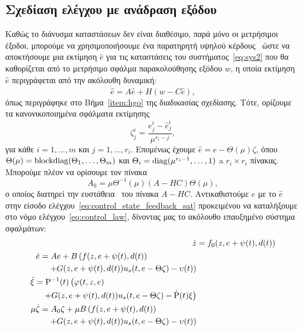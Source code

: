\subsection{Σχεδίαση ελέγχου με ανάδραση εξόδου}
\label{section:output_feedback}
Καθώς το διάνυσμα καταστάσεων δεν είναι διαθέσιμο, παρά μόνο οι μετρήσιμοι έξοδοι, μπορούμε να χρησιμοποιήσουμε ένα παρατηρητή υψηλού κέρδους~\cite{khalil1996noninear, atassi1999separation, khalil2008high} ώστε να αποκτήσουμε μια εκτίμηση $\hat e$ για τις καταστάσεις του συστήματος~\eqref{eq:sys2} που θα καθορίζεται από το μετρήσιμο σφάλμα παρακολούθησης εξόδου $w$, η οποία εκτίμηση $\hat e$ περιγράφεται από την ακόλουθη δυναμική:
\[
    \dot{\hat e} = A \hat e + H (w - C \hat e),
\]
όπως περιγράφηκε στο Βήμα~\ref{item:hgo} της διαδικασίας σχεδίασης. Τότε, ορίζουμε τα κανονικοποιημένα σφάλματα εκτίμησης
\[
    \zeta_j^i = \frac{e_j^i - \hat e_j^i}{\mu^{r_i-j}},
\]
για κάθε $i=1,\ldots,m$ και $j = 1,\ldots, r_i$. Επομένως έχουμε $\hat e = e - \Theta(\mu) \zeta$, όπου $\Theta(\mu) = \operatorname{blockdiag}(\Theta_1, \ldots, \Theta_m)$ και $\Theta_i = \operatorname{diag}(\mu^{r_i-1}, \ldots, 1)$ a $r_i \times r_i$ πίνακας. Μπορούμε πλέον να ορίσουμε τον πίνακα
\[
    A_0 = \mu \Theta^{-1}(\mu)(A - HC) \Theta(\mu),
\]
ο οποίος διατηρεί την ευστάθεια \hur\ του πίνακα $A-HC$. Αντικαθιστούμε $e$ με το $\hat e$ στην είσοδο ελέγχου~\eqref{eq:control_state_feedback_sat} προκειμένου να καταλήξουμε στο νόμο ελέγχου~\eqref{eq:control_law}, δίνοντας μας το ακόλουθο επαυξημένο σύστημα σφαλμάτων:
\begin{subequations}
    \label{eq:sys4}
    \begin{align}
        \dot z &= f_0(z, e + \psi(t), d(t))\\
        \begin{split}
            \dot e &= A e + B \left(f(z,e + \psi(t), d(t)) \right. \\
            &\quad \left. + G(z,e + \psi(t), d(t)) u_s(t, e - \Theta\zeta) 
                - \upsilon(t)\right)
        \end{split}\\
        \begin{split}
            \dot \xi &= \Rho^{-1}(t) \left(
                    \varphi(t,z,e) \vphantom{\dot \Rho} \right.  \\
            &\quad \left. + G(z, e + \psi(t), d(t))u_s(t,e - \Theta \zeta)
                - \dot \Rho(t)\xi \right)
        \end{split}\\
        \begin{split}
        \mu \dot \zeta &= A_0\zeta 
            + \mu B \left(f(z,e + \psi(t), d(t)) \right. \\
        &\quad \left. + G(z,e + \psi(t), d(t)) u_s(t, e - \Theta\zeta) 
            - \upsilon(t)\right)
        \end{split}
    \end{align}
\end{subequations}
